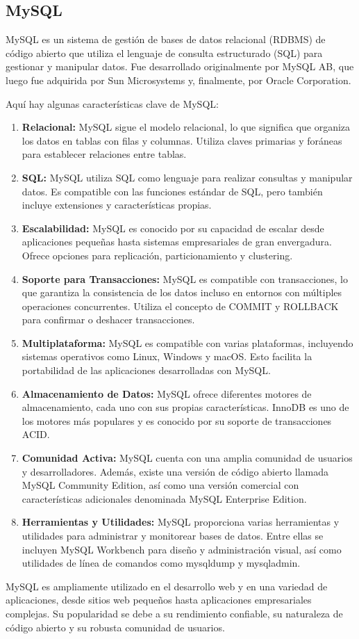 \documentclass[a4paper, 12pt]{book}
\begin{document}
\subsection{MySQL}
\label{subsec:mysql}
MySQL es un sistema de gestión de bases de datos relacional (RDBMS) de código abierto que utiliza el lenguaje de consulta estructurado (SQL) para gestionar y manipular datos. Fue desarrollado originalmente por MySQL AB, que luego fue adquirida por Sun Microsystems y, finalmente, por Oracle Corporation.

Aquí hay algunas características clave de MySQL:
\begin{enumerate}
  \item \textbf{Relacional:} MySQL sigue el modelo relacional, lo que significa que organiza los datos en tablas con filas y columnas. Utiliza claves primarias y foráneas para establecer relaciones entre tablas.
  \item \textbf{SQL:} MySQL utiliza SQL como lenguaje para realizar consultas y manipular datos. Es compatible con las funciones estándar de SQL, pero también incluye extensiones y características propias.
  \item \textbf{Escalabilidad:} MySQL es conocido por su capacidad de escalar desde aplicaciones pequeñas hasta sistemas empresariales de gran envergadura. Ofrece opciones para replicación, particionamiento y clustering.
  \item \textbf{Soporte para Transacciones:} MySQL es compatible con transacciones, lo que garantiza la consistencia de los datos incluso en entornos con múltiples operaciones concurrentes. Utiliza el concepto de COMMIT y ROLLBACK para confirmar o deshacer transacciones.
  \item \textbf{Multiplataforma:} MySQL es compatible con varias plataformas, incluyendo sistemas operativos como Linux, Windows y macOS. Esto facilita la portabilidad de las aplicaciones desarrolladas con MySQL.
  \item \textbf{Almacenamiento de Datos:} MySQL ofrece diferentes motores de almacenamiento, cada uno con sus propias características. InnoDB es uno de los motores más populares y es conocido por su soporte de transacciones ACID.
  \item \textbf{Comunidad Activa:} MySQL cuenta con una amplia comunidad de usuarios y desarrolladores. Además, existe una versión de código abierto llamada MySQL Community Edition, así como una versión comercial con características adicionales denominada MySQL Enterprise Edition.
  \item \textbf{Herramientas y Utilidades:} MySQL proporciona varias herramientas y utilidades para administrar y monitorear bases de datos. Entre ellas se incluyen MySQL Workbench para diseño y administración visual, así como utilidades de línea de comandos como mysqldump y mysqladmin.
\end{enumerate}
MySQL es ampliamente utilizado en el desarrollo web y en una variedad de aplicaciones, desde sitios web pequeños hasta aplicaciones empresariales complejas. Su popularidad se debe a su rendimiento confiable, su naturaleza de código abierto y su robusta comunidad de usuarios.
\end{document}
